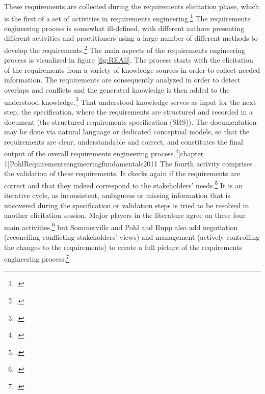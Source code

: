 These requirements are collected during the requirements elicitation phase, which is the first of a set of activities in requirements engineering.\footcites[Cf.][p.116]{SommervilleSoftwareengineering2011}[cf.][p.17]{SommervilleIntegratedrequirementsengineering2005} The requirements engineering process is somewhat ill-defined, with different authors presenting different activities and practitioners using a large number of different methods to develop the requirements.\footcite[Cf.][p.225]{ZhangEffectiverequirementsdevelopmentA2007} The main aspects of the requirements engineering process is visualized in figure \ref{fig:REAll}. The process starts with the elicitation of the requirements from a variety of knowledge sources in order to collect needed information. The requirements are consequently analyzed in order to detect overlaps and conflicts and the generated knowledge is then added to the understood knowledge.\footcite[Cf.][p.17]{SommervilleIntegratedrequirementsengineering2005} That understood knowledge serves as input for the next step, the specification, where the requirements are structured and recorded in a document (the structured requirements specification (SRS)). The documentation may be done via natural language or dedicated conceptual models, so that the requirements are clear, understandable and correct, and constitutes the final output of the overall requirements engineering process.\footcite[Cf.][p.17]{SommervilleIntegratedrequirementsengineering2005}[chapter 1]{PohlRequirementsengineeringfundamentals2011} The fourth activity comprises the validation of these requirements. It checks again if the requirements are correct and that they indeed correspond to the stakeholders' needs.\footcite[Cf.][p.17]{SommervilleIntegratedrequirementsengineering2005}
It is an iterative cycle, as inconsistent, ambiguous or missing information that is uncovered during the specification or validation steps is tried to be resolved in another elicitation session. 
Major players in the literature agree on these four main activities,\footcites[Cf.][p.225]{ZhangEffectiverequirementsdevelopmentA2007}[cf.][p.220]{DavisSoftwarerequirementsobjects1993}[cf.][chapter 1]{PohlRequirementsengineeringfundamentals2011}[cf.][p.116]{SommervilleSoftwareengineering2011} but Sommerville and Pohl and Rupp also add negotiation (reconciling conflicting stakeholders' views) and management (actively controlling the changes to the requirements) to create a full picture of the requirements engineering process.\footcites[Cf.][p.17]{SommervilleSoftwareengineering2011}[cf.][chapter 1]{PohlRequirementsengineeringfundamentals2011}


